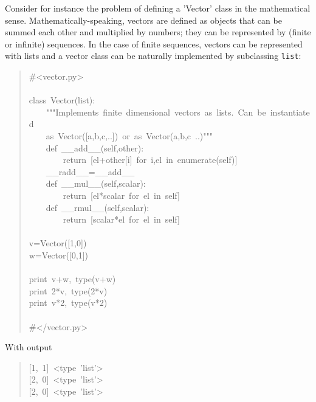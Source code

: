 \documentclass[10pt,english]{article}
\begin{document}
Consider for instance the problem of defining a 'Vector' class in the 
mathematical sense. Mathematically-speaking, vectors are defined as objects 
that can be summed each other and multiplied by numbers; they can be represented 
by (finite or infinite) sequences. In the case of finite sequences, vectors 
can be represented with lists and a vector class can be naturally
implemented by subclassing \texttt{list}:
\begin{quote}
\begin{ttfamily}\begin{flushleft}
\mbox{{\#}<vector.py>}\\
\mbox{}\\
\mbox{class~Vector(list):}\\
\mbox{~~~~"""Implements~finite~dimensional~vectors~as~lists.~Can~be~instantiated}\\
\mbox{~~~~as~Vector([a,b,c,..])~or~as~Vector(a,b,c~..)"""}\\
\mbox{~~~~def~{\_}{\_}add{\_}{\_}(self,other):}\\
\mbox{~~~~~~~~return~[el+other[i]~for~i,el~in~enumerate(self)]}\\
\mbox{~~~~{\_}{\_}radd{\_}{\_}={\_}{\_}add{\_}{\_}}\\
\mbox{~~~~def~{\_}{\_}mul{\_}{\_}(self,scalar):}\\
\mbox{~~~~~~~~return~[el*scalar~for~el~in~self]}\\
\mbox{~~~~def~{\_}{\_}rmul{\_}{\_}(self,scalar):}\\
\mbox{~~~~~~~~return~[scalar*el~for~el~in~self]}\\
\mbox{}\\
\mbox{v=Vector([1,0])}\\
\mbox{w=Vector([0,1])}\\
\mbox{}\\
\mbox{print~v+w,~type(v+w)~}\\
\mbox{print~2*v,~type(2*v)~}\\
\mbox{print~v*2,~type(v*2)~}\\
\mbox{}\\
\mbox{{\#}</vector.py>}
\end{flushleft}\end{ttfamily}
\end{quote}

With output
\begin{quote}
\begin{ttfamily}\begin{flushleft}
\mbox{[1,~1]~<type~'list'>}\\
\mbox{[2,~0]~<type~'list'>}\\
\mbox{[2,~0]~<type~'list'>}
\end{flushleft}\end{ttfamily}
\end{quote}
\end{document}
